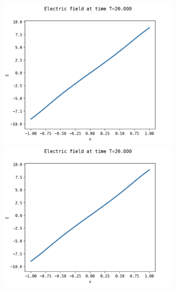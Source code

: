 \documentclass{article}
\numberwithin{equation}{section}
\newcommand{\imh}{\textheight} %
\newcommand{\imw}{\textwidth} %
\begin{document}
\begin{figure}
	\centering
	\newcommand{\rootSL}{../code_SL/}
	\newcommand{\rootFD}{../temp_res_DF/}
	\newcommand{\dirSL}{run_comp_long_time_2sp_Nx1000_Nvi2001_Nve2001_Nt100000}
	\newcommand{\dirFD}{run_comp_long_time_2sp_Nx200_Nv400_Nt2500000}
	
	\renewcommand{\imh}{0.24\textheight}
	\renewcommand{\imw}{0.45\linewidth}
	
	\begin{subfigure}{\textwidth}
		\centering
		\includegraphics[height=\imh,width=\imw]{images/ET20_run5af.png}
		\includegraphics[height=\imh,width=\imw]{images/ET20_run5af_2.png}

\end{subfigure}
\end{figure}
\end{document}
